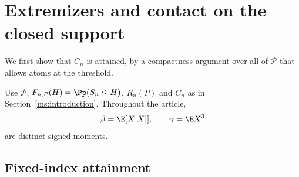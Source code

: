 \section{Extremizers and contact on the closed support}
\label{ms:extremizers}

We first show that $C_n$ is attained, by a compactness argument over all
of $\mathcal P$ that allows atoms at the threshold.

Use $\mathcal P$, $F_{n,P}(H)=\Pp(S_n\le H)$, $R_n(P)$ and $C_n$
as in Section~\ref{ms:introduction}. Throughout the article,
\[
 \beta=\E[X|X|],\qquad \gamma=\E X^3
\]
are distinct signed moments.

\subsection{Fixed-index attainment}

